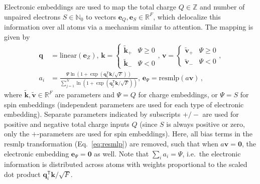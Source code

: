 \documentclass[%
superscriptaddress,
reprint,
nofootinbib,
amsmath,amssymb,amsfonts,
floatfix,
altaffilletter,
showkeys,
]{revtex4-2}
\begin{document}
Electronic embeddings are used to map the total charge $Q\in\mathbb{Z}$ and number of unpaired electrons $S\in\mathbb{N}_0$ to vectors $\mathbf{e}_Q,\mathbf{e}_S\in\mathbb{R}^F$, which delocalize this information over all atoms via a mechanism similar to attention.\cite{vaswani2017attention} The mapping is given by
\begin{equation}
\begin{aligned}
\mathbf{q} &= \mathrm{linear}(\mathbf{e}_{Z}) ,\,
\mathbf{k} = \begin{cases}
\tilde{\mathbf{k}}_{+} & \Psi \geq 0\\
\tilde{\mathbf{k}}_{-} & \Psi < 0
\end{cases} ,\,
\mathbf{v} = \begin{cases}
\tilde{\mathbf{v}}_{+} & \Psi \geq 0\\
\tilde{\mathbf{v}}_{-} & \Psi < 0
\end{cases} ,\\
a_i &=  \frac{\Psi\ln\left(1+\exp\left(\mathbf{q}_i^{\mathsf{T}}\mathbf{k}/\sqrt{F}\right)\right)}{\sum_{j=1}^{N}\ln\left(1+\exp\left(\mathbf{q}_j^{\mathsf{T}}\mathbf{k}/\sqrt{F}\right)\right) } ,\,
\mathbf{e}_{\Psi} = \mathrm{resmlp}(a\mathbf{v}) \,,
\end{aligned}
\label{eq:electronic_embedding}
\end{equation}
where $\tilde{\mathbf{k}},\tilde{\mathbf{v}} \in \mathbb{R}^F$ are parameters and $\Psi=Q$ for charge embeddings, or $\Psi=S$ for spin embeddings (independent parameters are used for each type of electronic embedding). Separate parameters indicated by subscripts $+/-$ are used for positive and negative total charge inputs $Q$ (since $S$ is always positive or zero, only the $+$\nobreakdash-parameters are used for spin embeddings). Here, all bias terms in the $\mathrm{resmlp}$ transformation (Eq.~\ref{eq:resmlp}) are removed, such that when $a\mathbf{v} = \mathbf{0}$, the electronic embedding $\mathbf{e}_{\Psi} = \mathbf{0}$ as well. Note that $\sum_{i}a_i = \Psi$, i.e.\ the electronic information is distributed across atoms with weights proportional to the scaled dot product $\mathbf{q}_i^{\mathsf{T}}\mathbf{k}/\sqrt{F}$.
\end{document}
